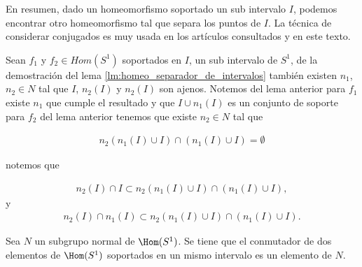 En resumen, dado un homeomorfismo soportado un sub intervalo $I$, podemos encontrar otro homeomorfismo tal que separa los puntos de $I$. La técnica de considerar conjugados es muy usada en los artículos consultados y en este texto.

\begin{ob}
Sean $f_1$ y $f_2 \in Hom(S^1)$  soportados en $I$, un sub intervalo de $S^1$, de la demostración del lema \ref{lm:homeo_separador_de_intervalos}
también existen $n_1$, $n_2 \in N$ tal que $I$, $n_2(I)$ y $n_2(I)$ son ajenos. Notemos del lema anterior  para $f_1$ existe $n_1$ que cumple el resultado y que $I \cup n_1(I)$ es un conjunto de soporte para $f_2$ del lema anterior tenemos que existe $n_2 \in N$ tal que

\begin{align*}
n_2(n_1(I) \cup I)\cap ( n_1(I) \cup I)= \emptyset
\end{align*}

notemos que 

\begin{align*}
n_2( I)\cap I \subset n_2(n_1(I) \cup I)\cap ( n_1(I) \cup I),
\end{align*}
y
\begin{align*}
n_2( I)\cap n_1(I) \subset n_2(n_1(I) \cup I)\cap ( n_1(I) \cup I).
\end{align*}

\end{ob}

  




\begin{lm}\label{lm:dos}
Sea $N$ un subgrupo normal de  $\Hom(S^1)$. Se tiene que el conmutador de dos elementos de  $\Hom(S^1)$ soportados en un mismo intervalo es un elemento de $N$.
\end{lm}

